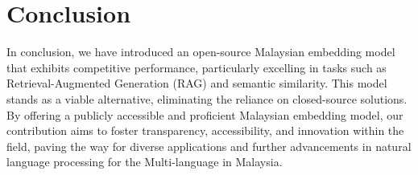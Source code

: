 \documentclass[preprint]{article}
\begin{document}
\section{Conclusion}

In conclusion, we have introduced an open-source Malaysian embedding model that exhibits competitive performance, particularly excelling in tasks such as Retrieval-Augmented Generation (RAG) and semantic similarity. This model stands as a viable alternative, eliminating the reliance on closed-source solutions. By offering a publicly accessible and proficient Malaysian embedding model, our contribution aims to foster transparency, accessibility, and innovation within the field, paving the way for diverse applications and further advancements in natural language processing for the Multi-language in Malaysia.

{}

\end{document}
